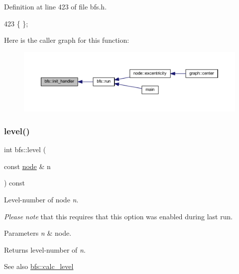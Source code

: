 Definition at line 423 of file bfs.\+h.


\begin{DoxyCode}
423 \{ \};
\end{DoxyCode}
Here is the caller graph for this function\+:
\nopagebreak
\begin{figure}[H]
\begin{center}
\leavevmode
\includegraphics[width=350pt]{classbfs_a558582dd7a92ce3b3b512c523e589c23_icgraph}
\end{center}
\end{figure}
\mbox{\label{classbfs_ac0158a0453fb17a89be4049d21db56b1}} 
\subsubsection{\texorpdfstring{level()}{level()}}
{\footnotesize\ttfamily int bfs\+::level (\begin{DoxyParamCaption}\item[{const \mbox{\hyperlink{classnode}{node}} \&}]{n }\end{DoxyParamCaption}) const\hspace{0.3cm}{\ttfamily [inline]}}



Level-\/number of node {\itshape n}. 

{\itshape Please} {\itshape note} that this requires that this option was enabled during last run.


\begin{DoxyParams}{Parameters}
{\em n} & node. \\
\hline
\end{DoxyParams}
\begin{DoxyReturn}{Returns}
level-\/number of {\itshape n}. 
\end{DoxyReturn}
\begin{DoxySeeAlso}{See also}
\mbox{\hyperlink{classbfs_a491515da4eb8efca0be4fef0df350a8e}{bfs\+::calc\+\_\+level}} 
\end{DoxySeeAlso}



